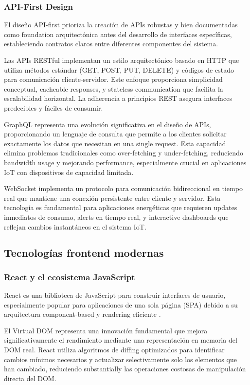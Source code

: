 \subsubsection{API-First Design}

El diseño API-first prioriza la creación de APIs robustas y bien documentadas como foundation arquitectónica antes del desarrollo de interfaces específicas, estableciendo contratos claros entre diferentes componentes del sistema.

Las APIs RESTful implementan un estilo arquitectónico basado en HTTP que utiliza métodos estándar (GET, POST, PUT, DELETE) y códigos de estado para comunicación cliente-servidor. Este enfoque proporciona simplicidad conceptual, cacheable responses, y stateless communication que facilita la escalabilidad horizontal. La adherencia a principios REST asegura interfaces predecibles y fáciles de consumir.

GraphQL representa una evolución significativa en el diseño de APIs, proporcionando un lenguaje de consulta que permite a los clientes solicitar exactamente los datos que necesitan en una single request. Esta capacidad elimina problemas tradicionales como over-fetching y under-fetching, reduciendo bandwidth usage y mejorando performance, especialmente crucial en aplicaciones IoT con dispositivos de capacidad limitada.

WebSocket implementa un protocolo para comunicación bidireccional en tiempo real que mantiene una conexión persistente entre cliente y servidor. Esta tecnología es fundamental para aplicaciones energéticas que requieren updates inmediatos de consumo, alerts en tiempo real, y interactive dashboards que reflejan cambios instantáneos en el sistema IoT.

\subsection{Tecnologías frontend modernas}

\subsubsection{React y el ecosistema JavaScript}

React es una biblioteca de JavaScript para construir interfaces de usuario, especialmente popular para aplicaciones de una sola página (SPA) debido a su arquitectura component-based y rendering eficiente \cite{banks2017react}.

El Virtual DOM representa una innovación fundamental que mejora significativamente el rendimiento mediante una representación en memoria del DOM real. React utiliza algoritmos de diffing optimizados para identificar cambios mínimos necesarios y actualizar selectivamente solo los elementos que han cambiado, reduciendo substantially las operaciones costosas de manipulación directa del DOM.

